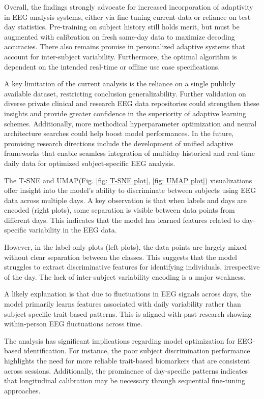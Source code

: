     Overall, the findings strongly advocate for increased incorporation of adaptivity in EEG analysis systems, either via fine-tuning current data or reliance on test-day statistics. Pre-training on subject history still holds merit, but must be augmented with calibration on fresh same-day data to maximize decoding accuracies. There also remains promise in personalized adaptive systems that account for inter-subject variability. Furthermore, the optimal algorithm is dependent on the intended real-time or offline use case specifications.
    
    A key limitation of the current analysis is the reliance on a single publicly available dataset, restricting conclusion generalizability. Further validation on diverse private clinical and research EEG data repositories could strengthen these insights and provide greater confidence in the superiority of adaptive learning schemes. Additionally, more methodical hyperparameter optimization and neural architecture searches could help boost model performances. In the future, promising research directions include the development of unified adaptive frameworks that enable seamless integration of multiday historical and real-time daily data for optimized subject-specific EEG analysis.

    
    The T-SNE\cite{van2008visualizing} and UMAP\cite{sainburg2021parametric}(Fig. \ref{fig: T-SNE plot}, \ref{fig: UMAP plot}) visualizations offer insight into the model's ability to discriminate between subjects using EEG data across multiple days. A key observation is that when labels and days are encoded (right plots), some separation is visible between data points from different days. This indicates that the model has learned features related to day-specific variability in the EEG data.

    However, in the label-only plots (left plots), the data points are largely mixed without clear separation between the classes. This suggests that the model struggles to extract discriminative features for identifying individuals, irrespective of the day. The lack of inter-subject variability encoding is a major weakness.
    
    A likely explanation is that due to fluctuations in EEG signals across days, the model primarily learns features associated with daily variability rather than subject-specific trait-based patterns. This is aligned with past research showing within-person EEG fluctuations across time.
    
    The analysis has significant implications regarding model optimization for EEG-based identification. For instance, the poor subject discrimination performance highlights the need for more reliable trait-based biomarkers that are consistent across sessions. Additionally, the prominence of day-specific patterns indicates that longitudinal calibration may be necessary through sequential fine-tuning approaches.
    

